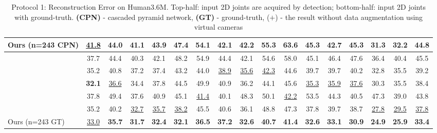 \documentclass[twocolumn]{svjour3}          \smartqed  \usepackage{graphicx}
\begin{document}
\begin{table*}
\begin{center}
{\begin{tabular}{l|ccccccccccccccc|c}
			\midrule
			Ours (n=243 CPN) &  \underline{41.8} &\textbf{44.0} & \textbf{41.1} & \textbf{43.9} & \textbf{47.4} &\textbf{54.1} & \textbf{42.1} &  \textbf{42.2} & \textbf{55.3} & \textbf{63.6} & \textbf{45.3} & \textbf{42.7} & 45.3 & \textbf{31.3} & \textbf{32.2} & \textbf{44.8}\\
          \midrule
			\midrule
\citep{Martinez2017} & 37.7 & 44.4 & 40.3 & 42.1 & 48.2 & 54.9 & 44.4 & 42.1 & 54.6 & 58.0 & 45.1 & 46.4 & 47.6 & 36.4 & 40.4 & 45.5 \\
\citep{Hossain2018} & 35.2 & 40.8 & 37.2 & 37.4 & 43.2 & 44.0 & \underline{38.9} & \underline{35.6} & \underline{42.3} & 44.6 & 39.7 & 39.7 & 40.2 & 32.8 & 35.5 & 39.2\\
\citep{lee2018} & \textbf{32.1} & \underline{36.6} &  34.4& 37.8 & 44.5 & 49.9 & 40.9 & 36.2 & 44.1 & 45.6 & \underline{35.3} & \underline{35.9} & \underline{37.6} & 30.3 & 35.5 & 38.4\\
\citep{zhao2019semantic} & 37.8 & 49.4 & 37.6 & 40.9 & 45.1 & \underline{41.4} & 40.1 & 48.3 & 50.1 & \underline{42.2} & 53.5 & 44.3 & 40.5 & 47.3 & 39.0 & 43.8\\
\citep{Pavllo2019} & 35.2 & 40.2 & \underline{32.7} & \underline{35.7} & \underline{38.2} & 45.5 & 40.6 & 36.1 & 48.8 & 47.3 & 37.8 & 39.7 & 38.7 & \underline{ 27.8} & \underline{29.5} & \underline{37.8}\\
			\midrule
			Ours (n=243 GT) & \underline{33.0} &  \textbf{35.7} & \textbf{31.7} & \textbf{32.4} & \textbf{32.1} & \textbf{36.5} & \textbf{37.2} &\textbf{32.6} &\textbf{40.7} & \textbf{41.4} & \textbf{32.6} & \textbf{33.1} & \textbf{30.9} & \textbf{24.9} & \textbf{25.9} & \textbf{33.4}\\

			\bottomrule
		\end{tabular}
		}
\end{center}
\caption{Protocol 1: Reconstruction Error on Human3.6M.  Top-half: input 2D joints are acquired by detection; bottom-half: input 2D joints with ground-truth. {\bf (CPN)} - cascaded pyramid network, {\bf (GT)} - ground-truth, ($+$) - the result without data augmentation using virtual cameras}
\label{tb:tb1}
\end{table*}
\end{document}
